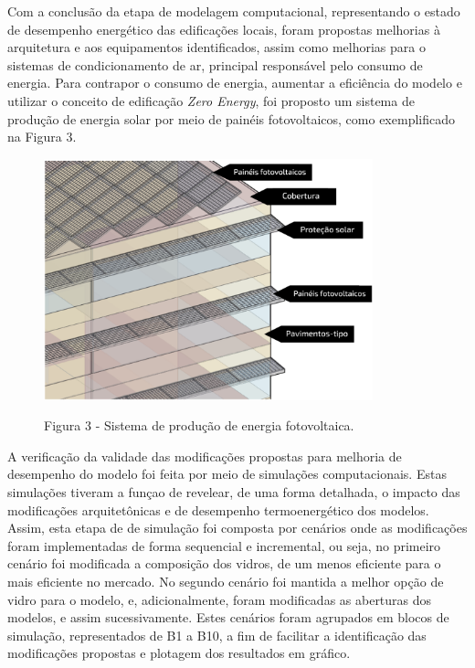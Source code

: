 \begin{onehalfspace}
    \noindent Com a conclusão da etapa de modelagem computacional, representando o estado de desempenho
    energético das edificações locais, foram propostas melhorias à arquitetura e aos equipamentos
    identificados, assim como melhorias para o sistemas de condicionamento de ar, principal
    responsável pelo consumo de energia. Para contrapor o consumo de energia, aumentar a
    eficiência do modelo e utilizar o conceito de edificação \textit{Zero Energy}, foi proposto
    um sistema de produção de energia solar por meio de painéis fotovoltaicos, como exemplificado
    na Figura 3.
    \begin{figure}[H]
        \centering
        \includegraphics[width=0.85\textwidth]{figures/paineis pv.png}
        \begin{flushleft}
            \small Figura 3 - Sistema de produção de energia fotovoltaica.
        \end{flushleft}
    \end{figure}

    \noindent A verificação da validade das modificações propostas para melhoria de 
    desempenho do modelo foi feita por meio de simulações computacionais. Estas simulações
    tiveram a funçao de revelear, de uma forma detalhada, o impacto das modificações 
    arquitetônicas e de desempenho termoenergético dos modelos. Assim, esta etapa de 
    de simulação foi composta por cenários onde as modificações foram implementadas 
    de forma sequencial e incremental, ou seja, no primeiro cenário foi 
    modificada a composição dos vidros, de um menos eficiente para o mais eficiente 
    no mercado. No segundo cenário foi mantida a melhor opção de vidro para o modelo, e,
    adicionalmente, foram modificadas as aberturas dos modelos, e assim sucessivamente.
    Estes cenários foram agrupados em blocos de simulação, representados de B1 a B10, a fim
    de facilitar a identificação das modificações propostas e plotagem dos resultados em 
    gráfico.\vspace*{0.3cm}


\end{onehalfspace}
